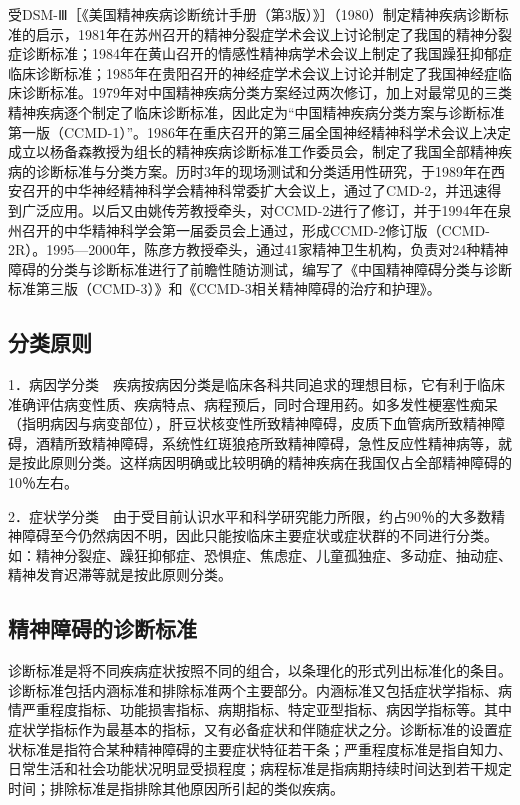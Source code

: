 受DSM-Ⅲ［《美国精神疾病诊断统计手册（第3版）》］（1980）制定精神疾病诊断标准的启示，1981年在苏州召开的精神分裂症学术会议上讨论制定了我国的精神分裂症诊断标准；1984年在黄山召开的情感性精神病学术会议上制定了我国躁狂抑郁症临床诊断标准；1985年在贵阳召开的神经症学术会议上讨论并制定了我国神经症临床诊断标准。1979年对中国精神疾病分类方案经过两次修订，加上对最常见的三类精神疾病逐个制定了临床诊断标准，因此定为``中国精神疾病分类方案与诊断标准第一版（CCMD-1）''。1986年在重庆召开的第三届全国神经精神科学术会议上决定成立以杨备森教授为组长的精神疾病诊断标准工作委员会，制定了我国全部精神疾病的诊断标准与分类方案。历时3年的现场测试和分类适用性研究，于1989年在西安召开的中华神经精神科学会精神科常委扩大会议上，通过了CMD-2，并迅速得到广泛应用。以后又由姚传芳教授牵头，对CCMD-2进行了修订，并于1994年在泉州召开的中华精神科学会第一届委员会上通过，形成CCMD-2修订版（CCMD-2R）。1995---2000年，陈彦方教授牵头，通过41家精神卫生机构，负责对24种精神障碍的分类与诊断标准进行了前瞻性随访测试，编写了《中国精神障碍分类与诊断标准第三版（CCMD-3）》和《CCMD-3相关精神障碍的治疗和护理》。

\subsection{分类原则}

1．病因学分类　疾病按病因分类是临床各科共同追求的理想目标，它有利于临床准确评估病变性质、疾病特点、病程预后，同时合理用药。如多发性梗塞性痴呆（指明病因与病变部位），肝豆状核变性所致精神障碍，皮质下血管病所致精神障碍，酒精所致精神障碍，系统性红斑狼疮所致精神障碍，急性反应性精神病等，就是按此原则分类。这样病因明确或比较明确的精神疾病在我国仅占全部精神障碍的10％左右。

2．症状学分类　由于受目前认识水平和科学研究能力所限，约占90％的大多数精神障碍至今仍然病因不明，因此只能按临床主要症状或症状群的不同进行分类。如：精神分裂症、躁狂抑郁症、恐惧症、焦虑症、儿童孤独症、多动症、抽动症、精神发育迟滞等就是按此原则分类。

\subsection{精神障碍的诊断标准}

诊断标准是将不同疾病症状按照不同的组合，以条理化的形式列出标准化的条目。诊断标准包括内涵标准和排除标准两个主要部分。内涵标准又包括症状学指标、病情严重程度指标、功能损害指标、病期指标、特定亚型指标、病因学指标等。其中症状学指标作为最基本的指标，又有必备症状和伴随症状之分。诊断标准的设置症状标准是指符合某种精神障碍的主要症状特征若干条；严重程度标准是指自知力、日常生活和社会功能状况明显受损程度；病程标准是指病期持续时间达到若干规定时间；排除标准是指排除其他原因所引起的类似疾病。

